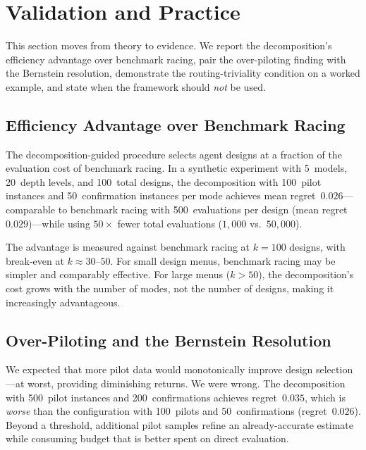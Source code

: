 \section{Validation and Practice}
\label{sec:validation}

This section moves from theory to evidence.
We report the decomposition's efficiency advantage over benchmark racing, pair the over-piloting finding with the Bernstein resolution, demonstrate the routing-triviality condition on a worked example, and state when the framework should \emph{not} be used.

\subsection{Efficiency Advantage over Benchmark Racing}
\label{sec:efficiency}

The decomposition-guided procedure selects agent designs at a fraction of the evaluation cost of benchmark racing.
In a synthetic experiment with 5~models, 20~depth levels, and 100~total designs, the decomposition with 100~pilot instances and 50~confirmation instances per mode achieves mean regret~$0.026$---comparable to benchmark racing with 500~evaluations per design (mean regret~$0.029$)---while using $50\times$ fewer total evaluations ($1{,}000$ vs.\ $50{,}000$).

The advantage is measured against benchmark racing at $k = 100$ designs, with break-even at $k \approx 30\text{--}50$.
For small design menus, benchmark racing may be simpler and comparably effective.
For large menus ($k > 50$), the decomposition's cost grows with the number of modes, not the number of designs, making it increasingly advantageous.

\subsection{Over-Piloting and the Bernstein Resolution}
\label{sec:over-piloting}

We expected that more pilot data would monotonically improve design selection---at worst, providing diminishing returns.
We were wrong.
The decomposition with 500~pilot instances and 200~confirmations achieves regret~$0.035$, which is \emph{worse} than the configuration with 100~pilots and 50~confirmations (regret~$0.026$).
Beyond a threshold, additional pilot samples refine an already-accurate estimate while consuming budget that is better spent on direct evaluation.

